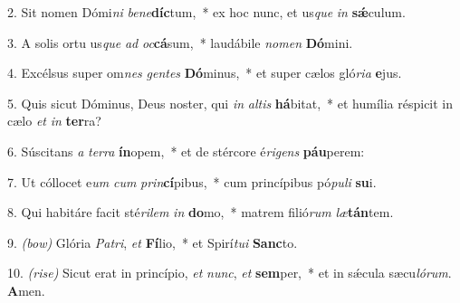 2. Sit nomen Dómi\textit{ni} \textit{be}\textit{ne}\textbf{díc}tum,~* 
	ex hoc nunc, et us\textit{que} \textit{in} \textbf{s\'{\ae}}culum.

3. A solis ortu us\textit{que} \textit{ad} \textit{oc}\textbf{cá}sum,~* 
	laudábile \textit{no}\textit{men} \textbf{Dó}mini.

4. Excélsus super om\textit{nes} \textit{gen}\textit{tes} \textbf{Dó}minus,~* 
	et super cælos gló\textit{ri}\textit{a} \textbf{e}jus.

5. Quis sicut Dóminus, Deus noster, qui \textit{in} \textit{al}\textit{tis} \textbf{há}bitat,~* 
	et humília réspicit in cælo \textit{et} \textit{in} \textbf{ter}ra?

6. Súscitans \textit{a} \textit{ter}\textit{ra} \textbf{ín}opem,~* 
	et de stércore é\textit{ri}\textit{gens} \textbf{páu}perem:

7. Ut cóllocet e\textit{um} \textit{cum} \textit{prin}\textbf{cí}pibus,~* 
	cum princípibus pó\textit{pu}\textit{li} \textbf{su}i.

8. Qui habitáre facit sté\textit{ri}\textit{lem} \textit{in} \textbf{do}mo,~* 
	matrem filió\textit{rum} \textit{læ}\textbf{tán}tem.

9. {\color{red}\textit{(bow)}} Glória \textit{Pa}\textit{tri}, \textit{et} \textbf{Fí}lio,~* 
	et Spirí\textit{tu}\textit{i} \textbf{Sanc}to.

10. {\color{red}\textit{(rise)}} Sicut erat in princípio, \textit{et} \textit{nunc}, \textit{et} \textbf{sem}per,~* 
	et in s\'{\ae}cula sæcu\textit{ló}\textit{rum}. \textbf{A}men.